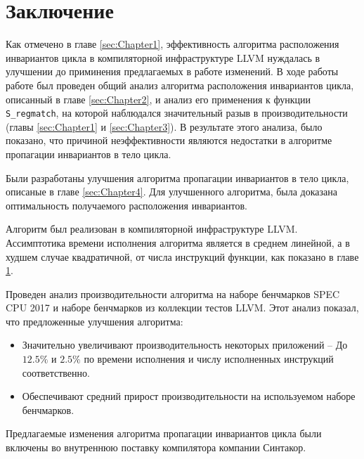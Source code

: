 \chapter{Заключение}
\label{sec:Chapter5} 

Как отмечено в главе \ref{sec:Chapter1}, эффективность алгоритма расположения инвариантов цикла в компиляторной инфраструктуре LLVM нуждалась в улучшении до приминения предлагаемых в работе изменений.
В ходе работы работе был проведен общий анализ алгоритма расположения инвариантов цикла, описанный в главе \ref{sec:Chapter2}, и анализ его применения к функции \texttt{S\_regmatch}, на которой наблюдался значительный разыв в производительности (главы \ref{sec:Chapter1} и \ref{sec:Chapter3}).
В результате этого анализа, было показано, что причиной неэффективности являются недостатки в алгоритме пропагации инвариантов в тело цикла.

Были разработаны улучшения алгоритма пропагации инвариантов в тело цикла, описаные в главе \ref{sec:Chapter4}.
Для улучшенного алгоритма, была доказана оптимальность получаемого расположения инвариантов.

Алгоритм был реализован в компиляторной инфраструктуре LLVM.
Ассимптотика времени исполнения алгоритма является в среднем линейной, а в худшем случае квадратичной, от числа инструкций функции, как показано в главе \ref{sec:Chapter5}.

Проведен анализ производительности алгоритма на наборе бенчмарков SPEC CPU\textsuperscript{\tiny\textregistered} 2017 и наборе бенчмарков из коллекции тестов LLVM.
Этот анализ показал, что предложенные улучшения алгоритма:
\begin{itemize}
    \item Значительно увеличивают производительность некоторых приложений --
        До $12.5\%$ и $2.5\%$ по времени исполнения и числу исполненных инструкций соответственно.
    \item Обеспечивают средний прирост производительности на используемом наборе бенчмарков.
\end{itemize}

Предлагаемые изменения алгоритма пропагации инвариантов цикла были включены во внутреннюю поставку компилятора компании Синтакор.

\newpage
